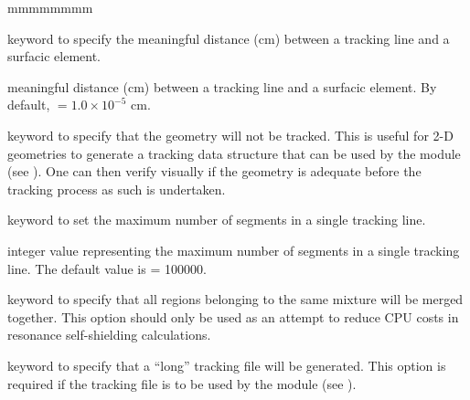 \begin{ListeDeDescription}{mmmmmmmm}
\item[\moc{CORN}] keyword to specify the meaningful distance (cm) between a tracking line and a surfacic element.

\item[\dusa{pcorn}] meaningful distance (cm) between a tracking line and a surfacic element. By default,  $=1.0 \times 10^{-5}$ cm.

\item[\moc{NOTR}] keyword to specify that the geometry will not be tracked. This is useful for 2-D geometries 
to generate a tracking data structure that can be used by the  module (see ). 
One can then verify visually if the geometry is adequate before the tracking process as such is 
undertaken.

\item[\moc{NBSLIN}] keyword to set the maximum number of segments in a single tracking line.

\item[\dusa{nbsl}] integer value representing the maximum number of segments in a single tracking line. The default value is  = 100000.

\item[\moc{MERGMIX}] keyword to specify that all regions belonging to the same mixture will be merged together. This option should only be used as an attempt to reduce CPU costs in resonance self-shielding calculations.

\item[\moc{LONG}] keyword to specify that a ``long'' tracking file will be generated. This option is required if the tracking file is to be used by the  module (see ).

\end{ListeDeDescription}
\clearpage
